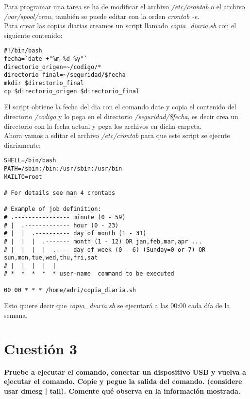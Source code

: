 \documentclass[a4paper, 11pt]{article} %
\begin{document}
\cite{8} Para programar una tarea se ha de modificar el archivo \textit{/etc/crontab} o el archivo \textit{/var/spool/cron}, también se puede editar con la orden \textit{crontab -e}.\\
Para crear las copias diarias creamos un script llamado \textit{copia\_diaria.sh} con el siguiente contenido:
\begin{verbatim}
#!/bin/bash
fecha=`date +"%m-%d-%y"`
directorio_origen=~/codigo/*
directorio_final=~/seguridad/$fecha
mkdir $directorio_final
cp $directorio_origen $directorio_final
\end{verbatim}
El script obtiene la fecha del dia con el comando date y copia el contenido del directorio \textit{\~/codigo} y lo pega en el directorio \textit{\~/seguridad/\$fecha}, es decir crea un directorio con la fecha actual y pega los archivos en dicha carpeta. \\
Ahora vamos a editar el archivo \textit{/etc/crontab} para que este script se ejecute diariamente:
\begin{verbatim}
SHELL=/bin/bash
PATH=/sbin:/bin:/usr/sbin:/usr/bin
MAILTO=root

# For details see man 4 crontabs

# Example of job definition:
# .---------------- minute (0 - 59)
# |  .------------- hour (0 - 23)
# |  |  .---------- day of month (1 - 31)
# |  |  |  .------- month (1 - 12) OR jan,feb,mar,apr ...
# |  |  |  |  .---- day of week (0 - 6) (Sunday=0 or 7) OR sun,mon,tue,wed,thu,fri,sat
# |  |  |  |  |
# *  *  *  *  * user-name  command to be executed

00 00 * * * /home/adri/copia_diaria.sh
\end{verbatim}
Esto quiere decir que \textit{copia\_diaria.sh} se ejecutará a las 00:00 cada día de la semana.

\section{Cuestión 3}
\textbf{Pruebe a ejecutar el comando, conectar un dispositivo USB y vuelva a ejecutar el comando. Copie y pegue la salida del comando. (considere usar dmesg | tail). Comente qué observa en la información mostrada.}\\
\end{document}
